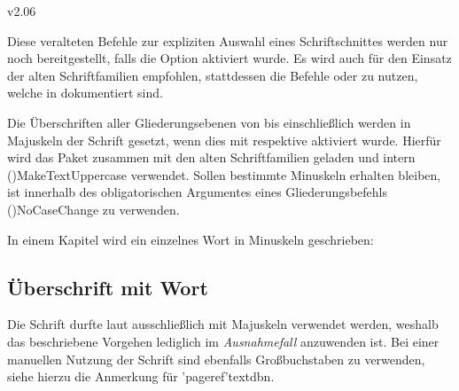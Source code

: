 \begin{Cessations}{v2.06}
\begin{Cessation}
\begin{Cessation}
\begin{Cessation}
\begin{Cessation}
\begin{Cessation}
\begin{Cessation}
\begin{Cessation}
\begin{Cessation}
\begin{Cessation}
\begin{Cessation}
\begin{Cessation}
\begin{Cessation}
\begin{Cessation}
\begin{Cessation}
\begin{Cessation}
\begin{Cessation}
\begin{Cessation}
\begin{Cessation}
Diese veralteten Befehle zur expliziten Auswahl eines Schriftschnittes werden 
nur noch bereitgestellt, falls die Option  aktiviert 
wurde. Es wird auch für den Einsatz der alten Schriftfamilien empfohlen, 
stattdessen die Befehle  oder  zu 
nutzen, welche in  dokumentiert sind.
\end{Cessation}
\end{Cessation}
\end{Cessation}
\end{Cessation}
\end{Cessation}
\end{Cessation}
\end{Cessation}
\end{Cessation}
\end{Cessation}
\end{Cessation}
\end{Cessation}
\end{Cessation}
\end{Cessation}
\end{Cessation}
\end{Cessation}
\end{Cessation}
\end{Cessation}
\end{Cessation}



Die Überschriften aller Gliederungsebenen von  bis einschließlich 
 werden in Majuskeln der Schrift \DIN gesetzt, wenn dies 
mit  respektive  
aktiviert wurde. Hierfür wird das Paket  zusammen mit den alten 
Schriftfamilien geladen und intern \Macro*(){MakeTextUppercase} 
verwendet. Sollen bestimmte Minuskeln erhalten bleiben, ist innerhalb des 
obligatorischen Argumentes eines Gliederungsbefehls 
\Macro*(){NoCaseChange} zu verwenden.
%
\begin{Example}
In einem Kapitel wird ein einzelnes Wort in Minuskeln geschrieben:
\begin{Code}
\chapter{Überschrift mit  Wort}
\end{Code}
\end{Example}
%
Die Schrift \DIN durfte laut \CD ausschließlich mit Majuskeln verwendet werden, 
weshalb das beschriebene Vorgehen lediglich im \emph{Ausnahmefall} anzuwenden 
ist. Bei einer manuellen Nutzung der Schrift sind ebenfalls Großbuchstaben zu 
verwenden, siehe hierzu die Anmerkung für \Macro'pageref'{textdbn}.
\end{Cessations}
%
